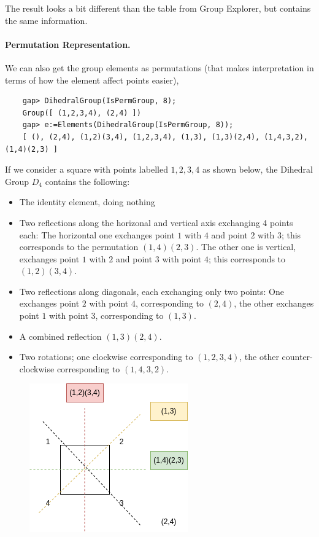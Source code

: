 The result looks a bit different than the table from Group Explorer, but contains the same information.

\paragraph{Permutation Representation.} We can also get the group elements as permutations (that makes interpretation in terms of how the element affect points easier),

\begin{verbatim}
    gap> DihedralGroup(IsPermGroup, 8);
    Group([ (1,2,3,4), (2,4) ])
    gap> e:=Elements(DihedralGroup(IsPermGroup, 8));
    [ (), (2,4), (1,2)(3,4), (1,2,3,4), (1,3), (1,3)(2,4), (1,4,3,2), (1,4)(2,3) ]
\end{verbatim}

If we consider a square with points labelled $1, 2, 3, 4$ as shown below, the Dihedral Group $D_4$ contains the following:

\begin{itemize}
    \item The identity element, doing nothing
    \item Two reflections along the horizonal and vertical axis exchanging 4 points each: The horizontal one exchanges point $1$ with $4$ and point $2$ with $3$; this corresponds to the permutation $(1,4)(2,3)$. The other one is vertical, exchanges point $1$ with $2$ and point $3$ with point $4$; this corresponds to $(1,2)(3,4)$.
    \item Two reflections along diagonals, each exchanging only two points: One exchanges point $2$ with point $4$, corresponding to $(2,4)$, the other exchanges point $1$ with point $3$, corresponding to $(1,3)$.
    \item A combined reflection $(1,3)(2,4)$.
    \item Two rotations; one clockwise corresponding to $(1,2,3,4)$, the other counter-clockwise corresponding to $(1,4,3,2)$.
\end{itemize}


\begin{figure}[H]
    \centering
    \includegraphics[scale=0.75]{images/2023-06-05_groups_gap_D4_2.png}
\end{figure}

